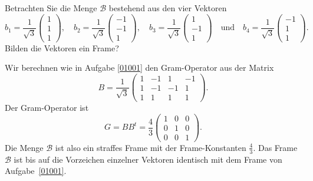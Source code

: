 Betrachten Sie die Menge $\mathcal{B}$ bestehend aus den vier Vektoren
\[
b_1
=
\frac{1}{\sqrt{3}}
\begin{pmatrix}
1\\1\\1
\end{pmatrix},\quad
b_2
=
\frac{1}{\sqrt{3}}
\begin{pmatrix}
-1\\-1\\1
\end{pmatrix},\quad
b_3
=
\frac{1}{\sqrt{3}}
\begin{pmatrix}
1\\-1\\1
\end{pmatrix}
\quad\text{und}\quad
b_4
=
\frac{1}{\sqrt{3}}
\begin{pmatrix}
-1\\1\\1
\end{pmatrix}.
\]
Bilden die Vektoren ein Frame?

\begin{loesung}
Wir berechnen wie in Aufgabe \ref{01001} den Gram-Operator aus der
Matrix
\[
B
=
\frac{1}{\sqrt{3}}
\begin{pmatrix}
1&-1& 1&-1\\
1&-1&-1& 1\\
1& 1& 1& 1
\end{pmatrix}.
\]
Der Gram-Operator ist
\[
G=BB^t
=
\frac43
\begin{pmatrix}
1&0&0\\
0&1&0\\
0&0&1
\end{pmatrix}.
\]
Die Menge $\mathcal{B}$ ist also ein straffes Frame mit der Frame-Konstanten
$\frac43$.
Das Frame $\mathcal{B}$ ist bis auf die Vorzeichen einzelner Vektoren
identisch mit dem Frame von Aufgabe~\ref{01001}.
\end{loesung}


